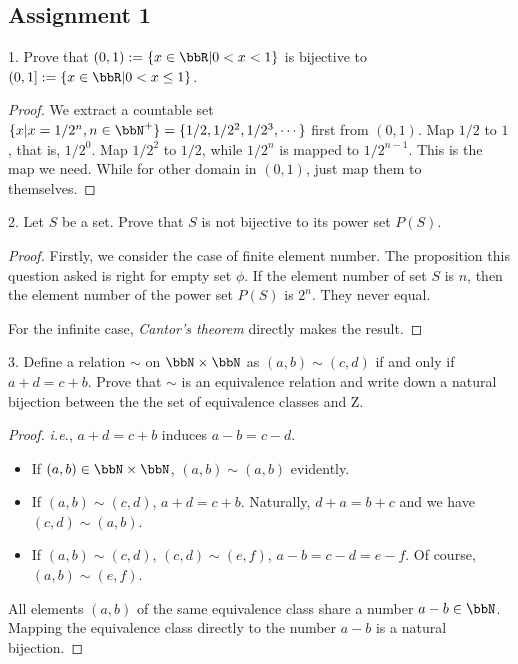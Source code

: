\subsection{Assignment 1}

\begin{exercise}
1. Prove that $(0,1) :=\{x \in \bbR|0 < x < 1\}$ is bijective to $(0,1] :=\{x\in \bbR | 0< x\leq 1\}$.
\end{exercise}

\begin{proof}
We extract a countable set $\{x|x=1/2^n,n\in \bbN^+ \}=\{1/2,1/2^2,1/2^3,\cdots\}$ first from $(0,1)$. Map $1/2$ to $1$, that is, $1/2^0$. Map $1/2^2$ to $1/2$, while $1/2^n$ is mapped to $1/2^{n-1}$. This is the map we need. While for other domain in $(0,1)$, just map them to themselves. 
\end{proof}

\begin{exercise}
2. Let $S$ be a set. Prove that $S$ is not bijective to its power set $P(S)$.
\end{exercise}
\begin{proof}
Firstly, we consider the case of finite element number. The proposition this question asked is right for empty set $\phi$. If the element number of set $S$ is $n$, then the element number of the power set $P(S)$ is $2^n$. They never equal.

For the infinite case, \textit{Cantor's theorem}  directly makes the result.
\end{proof}


\begin{exercise}
3. Define a relation $\sim $ on $\bbN\times\bbN$ as $(a, b)\sim(c, d)$ if and only if $a+d=c+b$. Prove that $\sim$ is an equivalence relation and write down a natural bijection between the the set of equivalence classes and Z.
\end{exercise}
\begin{proof}
\textit{i.e.}, $a+d=c+b$ induces $a-b=c-d$.

\begin{itemize}
    \item If $(a,b)\in \bbN\times\bbN$, $(a,b)\sim(a,b)$ evidently.
    \item If $(a, b)\sim(c, d)$, $a+d=c+b$. Naturally, $d+a=b+c$ and we have $(c, d)\sim(a, b)$.
    \item If $(a, b)\sim(c, d)$, $(c, d)\sim(e, f)$, $a-b=c-d=e-f$. Of course, $(a, b)\sim(e, f)$.
\end{itemize}

All elements $(a,b)$ of the same equivalence class share a number $a-b\in\bbN$. Mapping the equivalence class directly to the number $a-b$ is a natural bijection.
\end{proof}

